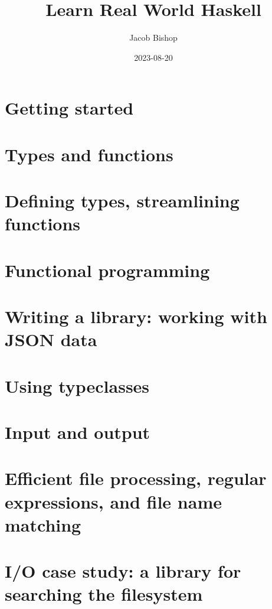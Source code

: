 \documentclass[UTF8]{ctexart}
\title{Learn Real World Haskell}
\author{Jacob Bishop}
\date{2023-08-20}
\begin{document}
\maketitle
\newpage

\section{Getting started}


\section{Types and functions}


\section{Defining types, streamlining functions}


\section{Functional programming}

\newpage

\section{Writing a library: working with JSON data}

\newpage

\section{Using typeclasses}

\newpage

\section{Input and output}

\newpage

\section{Efficient file processing, regular expressions, and file name matching}

\newpage

\section{I/O case study: a library for searching the filesystem}

\newpage
\end{document}
